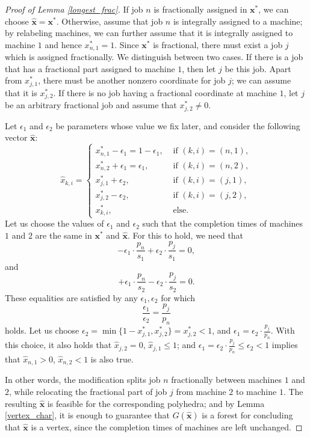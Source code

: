 \documentclass[a4paper,UKenglish,cleveref, autoref, thm-restate, pdfa]{lipics-v2021}
\theoremstyle{plain}
\begin{document}
\begin{proof}[Proof of Lemma \ref{longest_frac}]
    If job $n$ is fractionally assigned in $\bm{x}^*$, we can choose $\hat{\bm{x}} = \bm{x}^*$. Otherwise, assume that job $n$ is integrally assigned to a machine; by relabeling machines, we can further assume that it is integrally assigned to machine $1$ and hence $x^*_{n,1} = 1$. Since $\bm{x^*}$ is fractional, there must exist a job $j$ which is assigned fractionally. We distinguish between two cases. If there is a job that has a fractional part assigned to machine $1$, then let $j$ be this job. Apart from $x^*_{j,1}$, there must be another nonzero coordinate for job $j$; we can assume that it is $x^*_{j,2}$. If there is no job having a fractional coordinate at machine $1$, let $j$ be an arbitrary fractional job and assume that $x^*_{j,2} \ne 0$.

    Let $\epsilon_1$ and $\epsilon_2$ be parameters whose value we fix later, and consider the following vector $\bm{\hat{x}}$:
    \[
    \hat{x}_{k,i} = \begin{cases}
        x^*_{n,1} - \epsilon_1 = 1-\epsilon_1, & \text{ if } (k,i) = (n,1), \\
        x^*_{n,2} + \epsilon_1 = \epsilon_1, & \text{ if } (k,i) = (n,2), \\
        x^*_{j,1} + \epsilon_2, & \text{ if } (k,i) = (j,1), \\
        x^*_{j,2} - \epsilon_2, & \text{ if } (k,i) = (j,2), \\
        x^*_{k,i}, & \text{ else}.
    \end{cases}
    \]
    Let us choose the values of $\epsilon_1$ and $\epsilon_2$ such that the completion times of machines $1$ and $2$ are the same in $\bm{x}^*$ and $\bm{\hat{x}}$. For this to hold, we need that
    \[
    -\epsilon_1 \cdot \frac{p_n}{s_1} + \epsilon_2 \cdot \frac{p_j}{s_1} = 0,
    \]
    and 
    \[
    +\epsilon_1 \cdot \frac{p_n}{s_2} - \epsilon_2 \cdot \frac{p_j}{s_2} = 0.
    \]
    These equalities are satisfied by any $\epsilon_1, \epsilon_2$ for which 
    \[
    \frac{\epsilon_1}{\epsilon_2} = \frac{p_j}{p_n}
    \]
    holds. Let us choose $\epsilon_2 = \min\{1-x^*_{j,1}, x^*_{j,2}\} = x^*_{j,2} < 1$, and $\epsilon_1 = \epsilon_2 \cdot\frac{p_j}{p_n}$. With this choice, it also holds that $\hat{x}_{j,2} = 0$, $\hat{x}_{j,1} \le 1$; and $\epsilon_1 = \epsilon_2 \cdot \frac{p_j}{p_n} \le \epsilon_2 < 1$ implies that $\hat{x}_{n,1} > 0$, $\hat{x}_{n,2} < 1$ is also true.

    In other words, the modification splits job $n$ fractionally between machines $1$ and $2$, while relocating the fractional part of job $j$ from machine $2$ to machine $1$. The resulting $\bm{\hat{x}}$ is feasible for the corresponding polyhedra; and by Lemma \ref{vertex_char}, it is enough to guarantee that $G(\bm{\hat{x}})$ is a forest for concluding that $\bm{\hat{x}}$ is a vertex, since the completion times of machines are left unchanged.


\end{proof}
\end{document}
